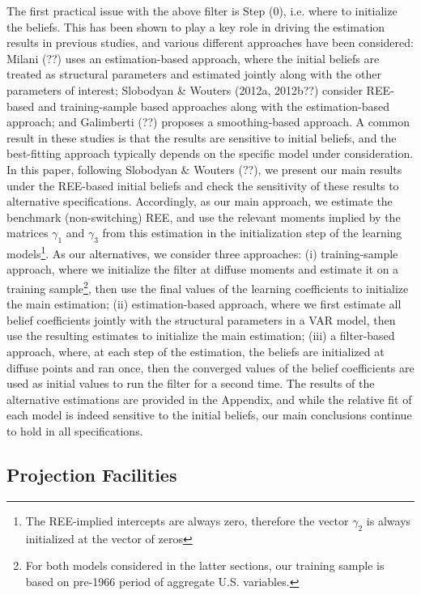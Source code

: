 \documentclass[12pt,reqno]{article}
\numberwithin{equation}{section}
\begin{document}
The first practical issue with the above filter is Step (0), i.e. where to initialize the beliefs. This has been shown to play a key role in driving the estimation results in previous studies, and various different approaches have been considered: Milani (??) uses an estimation-based approach, where the initial beliefs are treated as structural parameters and estimated jointly along with the other parameters of interest; Slobodyan \& Wouters (2012a, 2012b??) consider REE-based and training-sample based approaches along with the estimation-based approach; and Galimberti (??) proposes a smoothing-based approach. A common result in these studies is that  the results are sensitive to initial beliefs, and the best-fitting approach typically depends on the specific model under consideration. \\
\noindent
In this paper, following Slobodyan \& Wouters (??), we present our main results under the REE-based initial beliefs and check the sensitivity of these results to alternative specifications. Accordingly, as our main approach, we estimate the benchmark (non-switching) REE, and use the relevant moments implied by the matrices $\gamma_1$ and $\gamma_3$ from this estimation in the initialization step  of the learning models\footnote{The REE-implied intercepts are always zero, therefore the vector $\gamma_2$ is always initialized at the vector of zeros}. As our alternatives, we consider three approaches: (i) training-sample approach, where we initialize the filter at diffuse moments and estimate it on a training sample\footnote{For both models considered in the latter sections, our training sample is based on pre-1966 period of aggregate U.S. variables.}, then use the final values of the learning coefficients to initialize the main estimation; (ii) estimation-based approach, where we first estimate all belief coefficients jointly with the structural parameters in a VAR model, then use the resulting estimates to initialize the main estimation; (iii) a filter-based approach, where, at each step of the estimation, the beliefs are initialized at diffuse points and ran once, then the converged values of the belief coefficients are used as initial values to run the filter for a second time. The results of the alternative estimations are provided in the Appendix, and while the relative fit of each model is indeed sensitive to the initial beliefs, our main conclusions continue to hold in all specifications. 

\subsection{Projection Facilities} 
\end{document}
